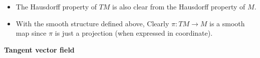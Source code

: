 \begin{enumerate}[(1)]
\begin{itemize}
\begin{align*}
                \sum_{i=1}^n V^i_\alpha 
                \pdv{y^1_\beta}{x^i_\alpha},
                \cdots,
                \sum_{i=1}^n V^i_\alpha 
                \pdv{y^n_\beta}{x^i_\alpha}
            \right)
        .\end{align*}
        Hence, \(\widetilde{\varphi}_\beta\circ 
        \widetilde{\varphi}_\alpha^{-1}\) is smooth since 
        \(\varphi_\beta\circ \varphi_\alpha^{-1}\)
        is smooth, and the transition function on the vector part 
        is just linear.
        \item The Hausdorff property of \(TM\) is also clear from 
        the Hausdorff property of \(M\).
        \item With the smooth structure defined above, Clearly
        \(\pi\colon TM\to M\) is a smooth map since \(\pi\) is
        just a projection (when expressed in coordinate).
    \end{itemize}
\end{enumerate}
    \textbf{Tangent vector field}
        
